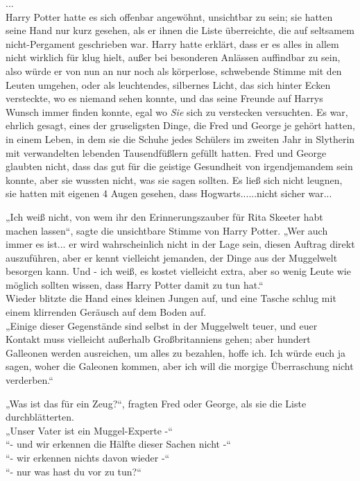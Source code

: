 {...\\ Harry Potter hatte es sich offenbar angewöhnt, unsichtbar zu sein; sie hatten seine Hand nur kurz gesehen, als er ihnen die Liste überreichte, die auf seltsamem nicht-Pergament geschrieben war. Harry hatte erklärt, dass er es alles in allem nicht wirklich für klug hielt, außer bei besonderen Anlässen auffindbar zu sein, also würde er von nun an nur noch als körperlose, schwebende Stimme mit den Leuten umgehen, oder als leuchtendes, silbernes Licht, das sich hinter Ecken versteckte, wo es niemand sehen konnte, und das seine Freunde auf Harrys Wunsch immer finden konnte, egal wo \emph{Sie} sich zu verstecken versuchten. Es war, ehrlich gesagt, eines der gruseligsten Dinge, die Fred und George je gehört hatten, in einem Leben, in dem sie die Schuhe jedes Schülers im zweiten Jahr in Slytherin mit verwandelten lebenden Tausendfüßlern gefüllt hatten. Fred und George glaubten nicht, dass das gut für die geistige Gesundheit von irgendjemandem sein konnte, aber sie wussten nicht, was sie sagen sollten. Es ließ sich nicht leugnen, sie hatten mit eigenen 4 Augen gesehen, dass Hogwarts......nicht sicher war...

„Ich weiß nicht, von wem ihr den Erinnerungszauber für Rita Skeeter habt machen lassen“, sagte die unsichtbare Stimme von Harry Potter. „Wer auch immer es ist... er wird wahrscheinlich nicht in der Lage sein, diesen Auftrag direkt auszuführen, aber er kennt vielleicht jemanden, der Dinge aus der Muggelwelt besorgen kann. Und - ich weiß, es kostet vielleicht extra, aber so wenig Leute wie möglich sollten wissen, dass Harry Potter damit zu tun hat.“\\ Wieder blitzte die Hand eines kleinen Jungen auf, und eine Tasche schlug mit einem klirrenden Geräusch auf dem Boden auf.\\ „Einige dieser Gegenstände sind selbst in der Muggelwelt teuer, und euer Kontakt muss vielleicht außerhalb Großbritanniens gehen; aber hundert Galleonen werden ausreichen, um alles zu bezahlen, hoffe ich. Ich würde euch ja sagen, woher die Galeonen kommen, aber ich will die morgige Überraschung nicht verderben.“

„Was ist das für ein Zeug?“, fragten Fred oder George, als sie die Liste durchblätterten.\\ „Unser Vater ist ein Muggel-Experte -“\\ “- und wir erkennen die Hälfte dieser Sachen nicht -“\\ “- wir erkennen nichts davon wieder -“\\ “- nur was hast du vor zu tun?“

}

